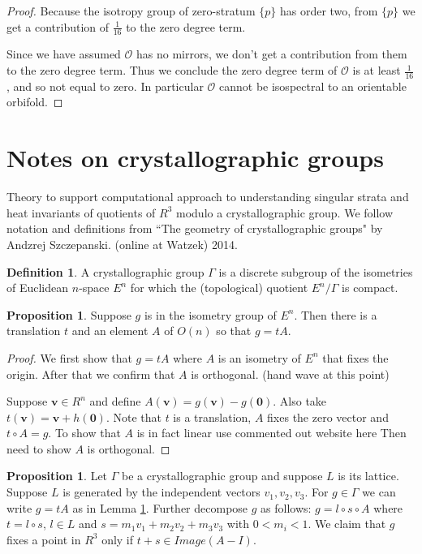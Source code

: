 \documentclass[12pt]{article}
\theoremstyle{definition}
\newtheorem{proposition}[theorem]{Proposition}
\newtheorem{definition}[theorem]{Definition}
\newcommand{\vv}{\mathbf v}
\newcommand{\zv}{\mathbf 0}
\begin{document}
\begin{proof}
Because the isotropy group of zero-stratum $\{p\}$ has order two, from $\{p\}$ we get a contribution of $\frac{1}{16}$ to the zero degree term.  

Since we have assumed $\mathcal{O}$ has no mirrors, we don't get a contribution from them to the zero degree term.  Thus we conclude the zero degree term of $\mathcal{O}$ is at least $\frac{1}{16}$, and so not equal to zero.  In particular $\mathcal{O}$ cannot be isospectral to an orientable orbifold.

\end{proof}

\section{Notes on crystallographic groups}

Theory to support computational approach to understanding singular strata and heat invariants of quotients of $R^3$ modulo a crystallographic group.  We follow notation and definitions from ``The geometry of crystallographic groups" by Andzrej Szczepanski. (online at Watzek) 2014.

\begin{definition}  A crystallographic group $\Gamma$ is a discrete subgroup of the isometries of Euclidean $n$-space $E^n$ for which the (topological) quotient $E^n/\Gamma$ is compact.
\end{definition}

\begin{proposition} \label{decomposition} Suppose $g$ is in the isometry group of $E^n$.  Then there is a translation $t$ and an element $A$ of $O(n)$ so that $g=t A$.
\end{proposition}

\begin{proof}  We first show that $g=t A$ where $A$ is an isometry of $E^n$ that fixes the origin.  After that we confirm that $A$ is orthogonal.  (hand wave at this point)

Suppose $\vv \in R^n$ and define $A(\vv)=g(\vv)-g(\zv)$.  Also take $t(\vv)=\vv+h(\zv)$.  Note that  $t$ is a translation, $A$ fixes the zero vector and $t\circ A=g$.  To show that $A$ is in fact linear use commented out website here %
Then need to show $A$ is orthogonal.
\end{proof}

\begin{proposition}  Let $\Gamma$ be a crystallographic group and suppose $L$ is its lattice.  Suppose $L$ is generated by the independent vectors $v_1, v_2, v_3$.  For $g\in \Gamma$ we can write $g=tA$ as in Lemma \ref{decomposition}.  Further decompose $g$ as follows:  $g=l \circ s \circ A$ where $t=l\circ s$, $l \in L$ and $s=m_1v_1+m_2v_2+m_3v_3$ with $0 < m_i < 1$.  We claim that $g$ fixes a point in $R^3$ only if $t+s \in Image(A-I)$.
\end{proposition}
\end{document}
